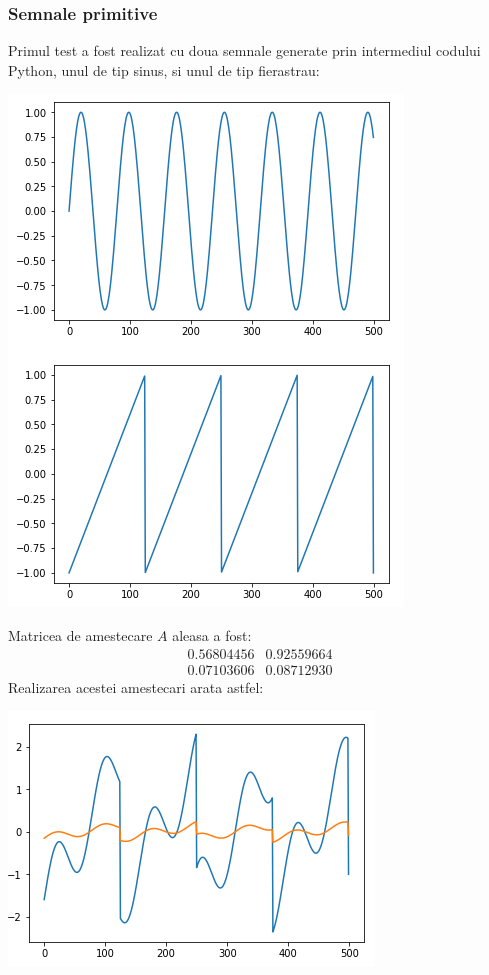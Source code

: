 \documentclass[12pt,oneside]{article}
\begin{document}
\subsubsection{Semnale primitive}
Primul test a fost realizat cu doua semnale generate prin intermediul codului Python, unul de tip sinus, si unul de tip fierastrau:
\begin{center}
	\includegraphics[scale=0.8]{primitive_waves}
\end{center}

Matricea de amestecare $A$ aleasa a fost:
\[
 \begin{matrix}
 	0.56804456  & 0.92559664 \\
	0.07103606  & 0.08712930 
 \end{matrix}
\]
Realizarea acestei amestecari arata astfel:
\begin{center}
	\includegraphics[scale=1]{primitives_mixed}
 \end{center}
\end{document}
